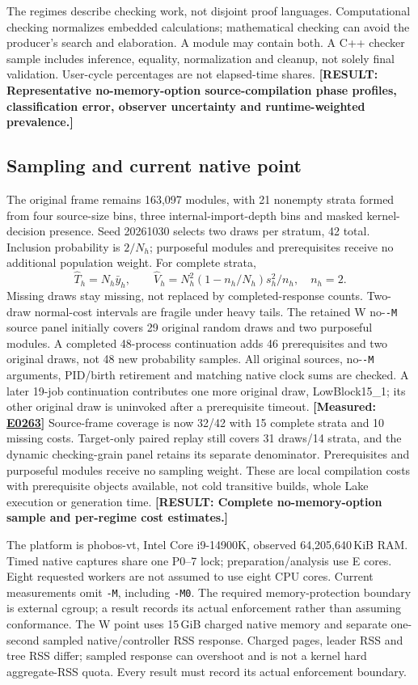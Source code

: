 \documentclass[10pt,twocolumn]{article}
\newcommand{\missing}[1]{\textbf{[RESULT: #1]}}
\newcommand{\measured}[1]{\textbf{[Measured: #1]}}
\newcommand{\expref}[2]{\href{https://github.com/yunwei37/proofserve/blob/main/docs/tmp/build-and-evaluate/step-#1/step-report.md}{E#2}}
\begin{document}
The regimes describe checking work, not disjoint proof languages.
Computational checking normalizes embedded calculations; mathematical
checking can avoid the producer's search and elaboration.
A module may contain both. A C++ checker sample includes inference, equality,
normalization and cleanup, not solely final validation.
User-cycle percentages are not elapsed-time shares.
\missing{Representative no-memory-option source-compilation phase profiles,
classification error, observer uncertainty and runtime-weighted prevalence.}

\subsection{Sampling and current native point}
The original frame remains 163,097 modules, with 21 nonempty strata formed
from four source-size bins, three internal-import-depth bins and
masked kernel-decision presence.
Seed 20261030 selects two draws per stratum, 42 total.
Inclusion probability is $2/N_h$; purposeful modules and prerequisites
receive no additional population weight.
For complete strata,
\[
\widehat T_h=N_h\bar y_h,\qquad
\widehat V_h=N_h^2(1-n_h/N_h)s_h^2/n_h,\quad n_h=2.
\]
Missing draws stay missing, not replaced by completed-response counts.
Two-draw normal-cost intervals are fragile under heavy tails.
The retained W no-\texttt{-M} source panel initially covers 29 original
random draws and two purposeful modules.
A completed 48-process continuation adds 46 prerequisites and two original
draws, not 48 new probability samples.
All original sources, no-\texttt{-M} arguments, PID/birth retirement and
matching native clock sums are checked.
A later 19-job continuation contributes one more original draw, LowBlock15\_1;
its other original draw is uninvoked after a prerequisite timeout.
\measured{\expref{0263-20261102T040256+0000}{0263}}
Source-frame coverage is now 32/42 with 15 complete strata and 10 missing
costs. Target-only paired replay still covers 31 draws/14 strata, and the
dynamic checking-grain panel retains its separate denominator.
Prerequisites and purposeful modules receive no sampling weight.
These are local compilation costs with prerequisite objects available,
not cold transitive builds, whole Lake execution or generation time.
\missing{Complete no-memory-option sample and per-regime cost estimates.}

The platform is phobos-vt, Intel Core i9-14900K,
observed 64,205,640\,KiB RAM.
Timed native captures share one P0--7 lock; preparation/analysis use E cores.
Eight requested workers are not assumed to use eight CPU cores.
Current measurements omit \texttt{-M}, including \texttt{-M0}.
The required memory-protection boundary is external cgroup;
a result records its actual enforcement rather than assuming conformance.
The W point uses 15\,GiB charged native memory and separate one-second
sampled native/controller RSS response.
Charged pages, leader RSS and tree RSS differ; sampled response can overshoot
and is not a kernel hard aggregate-RSS quota.
Every result must record its actual enforcement boundary.
\end{document}
